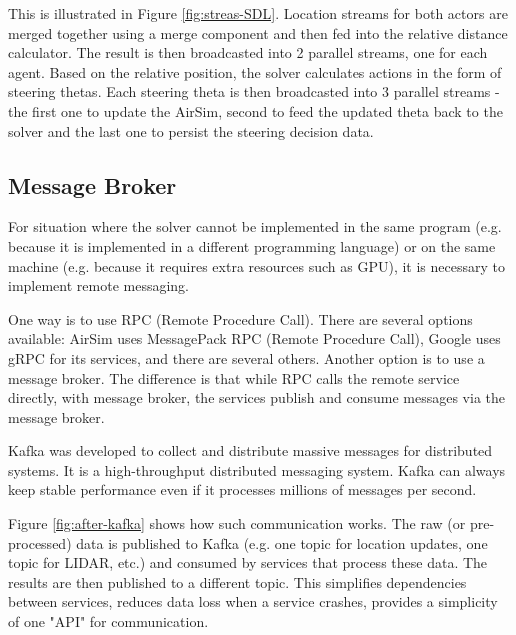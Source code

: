 \documentclass{article}
\begin{document}
This is illustrated in Figure \ref{fig:streas-SDL}. Location streams for both actors are merged together using a merge component and then fed into the relative distance calculator. The result is then broadcasted into 2 parallel streams, one for each agent. Based on the relative position, the solver calculates actions in the form of steering thetas. Each steering theta is then broadcasted into 3 parallel streams - the first one to update the AirSim, second to feed the updated theta back to the solver and the last one to persist the steering decision data.









\subsection{Message Broker}
For situation where the solver cannot be implemented in the same program (e.g. because it is implemented in a different programming language) or on the same machine (e.g. because it requires extra resources such as GPU), it is necessary to implement remote messaging.
 
One way is to use RPC (Remote Procedure Call). There are several options available: AirSim uses MessagePack RPC (Remote Procedure Call), Google uses gRPC for its services, and there are several others. Another option is to use a message broker. The difference is that while RPC calls the remote service directly, with message broker, the services publish and consume messages via the message broker.

Kafka was developed to collect and distribute massive messages for distributed systems. It is a high-throughput distributed messaging system. Kafka can always keep stable performance even if it processes millions of messages per second. \cite{wang2015kafka}

Figure \ref{fig:after-kafka} shows how such communication works. The raw (or pre-processed) data is published to Kafka (e.g. one topic for location updates, one topic for LIDAR, etc.) and consumed by services that process these data. The results are then published to a different topic. This simplifies dependencies between services, reduces data loss when a service crashes, provides a simplicity of one "API" for communication.
\end{document}
